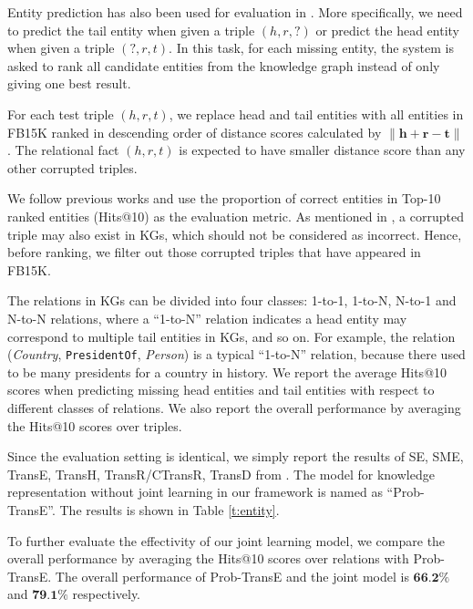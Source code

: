 \documentclass[11pt,a4paper]{article}
\begin{document}
Entity prediction has also been used for evaluation in \cite{bordes2013translating,wang2014transh,lin2015learning,ji2015knowledge,he2015learning,xiao2015transg,ji2016knowledge}. More specifically, we need to predict the tail entity when given a triple $(h, r, ?)$ or predict the head entity when given a triple $(?, r ,t)$. In this task, for each missing entity, the system is asked to rank all candidate entities from the knowledge graph instead of only giving one best result. 

For each test triple $(h, r, t)$, we replace head and tail entities with all entities in FB15K ranked in descending order of distance scores calculated by $\lVert \textbf{h} + \textbf{r} - \textbf{t} \rVert$. The relational fact $(h, r, t)$ is expected to have smaller distance score than any other corrupted triples.

We follow previous works and use the proportion of correct entities in Top-10 ranked entities (Hits@10) as the evaluation metric. As mentioned in \cite{bordes2013translating}, a corrupted triple may also exist in KGs, which should not be considered as incorrect. Hence, before ranking, we filter out those corrupted triples that have appeared in FB15K.

The relations in KGs can be divided into four classes: 1-to-1, 1-to-N, N-to-1 and N-to-N relations, where a ``1-to-N'' relation indicates a head entity may correspond to multiple tail entities in KGs, and so on. For example, the relation (\emph{Country}, \texttt{PresidentOf}, \emph{Person}) is a typical ``1-to-N'' relation, because there used to be many presidents for a country in history. We report the average Hits@10 scores when predicting missing head entities and tail entities with respect to different classes of relations. We also report the overall performance by averaging the Hits@10 scores over triples. 

Since the evaluation setting is identical, we simply report the results of SE, SME, TransE, TransH, TransR/CTransR, TransD from \cite{bordes2011learning,bordes2012joint,bordes2013translating,wang2014transh,lin2015learning,ji2015knowledge}. The model for knowledge representation without joint learning in our framework is named as ``Prob-TransE''. The results is shown in Table \ref{t:entity}. 

To further evaluate the effectivity of our joint learning model, we compare the overall performance by averaging the Hits@10 scores over relations with Prob-TransE. The overall performance of Prob-TransE and the joint model is $\textbf{66.2\%}$ and $\textbf{79.1\%}$ respectively. 
\end{document}
